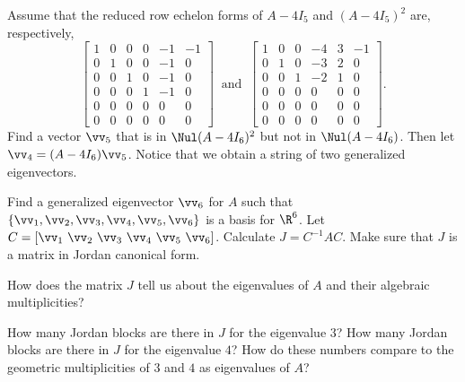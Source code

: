 \begin{activity}
\item Assume that the reduced row echelon forms of $A -4 I_5$ and $(A-4I_5)^2$ are, respectively,  
\[  \left[ \begin{array}{ccccrr} 1&0&0&0&-1&-1\\ 0&1&0&0&-1&0\\ 0&0&1&0&-1&0\\ 0&0&0&1&-1&0 \\ 0&0&0&0&0&0 \\ 0&0&0&0&0&0 \end{array} \right] \  \text{ and } \ \left[ \begin{array}{cccrcr} 1&0&0&-4&3&-1\\ 0&1&0&-3&2&0 \\ 0&0&1&-2&1&0\\ 0&0&0&0&0&0\\ 0&0&0&0&0&0\\ 0&0&0&0&0&0 \end{array} \right]. \]
Find a vector $\vv_5$ that is in $\Nul (A-4I_6)^2$ but not in $\Nul (A-4I_6)$. Then let $\vv_4 = (A-4I_6)\vv_5$. Notice that we obtain a string of two generalized eigenvectors. 

\item Find a generalized eigenvector $\vv_6$ for $A$ such that $\{\vv_1, \vv_2, \vv_3, \vv_4, \vv_5, \vv_6\}$ is a basis for $\R^6$. Let $C = [\vv_1 \ \vv_2 \ \vv_3 \ \vv_4 \ \vv_5 \ \vv_6]$. Calculate $J=C^{-1}AC$. Make sure that $J$ is a matrix in Jordan canonical form. 

\item How does the matrix $J$ tell us about the eigenvalues of $A$ and their algebraic multiplicities? 

\item How many Jordan blocks are there in $J$ for the eigenvalue $3$? How many Jordan blocks are there in $J$ for the eigenvalue $4$? How do these numbers compare to the geometric multiplicities of $3$ and $4$ as eigenvalues of $A$?

\ea

\end{activity}

